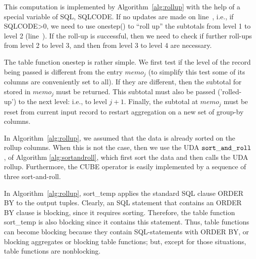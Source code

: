 {This computation is implemented by Algorithm~\ref{alg:rollup} with the
help of a special variable of SQL, {\cw SQLCODE}.  If no updates are made on
line~, i.e., if {\cw SQLCODE>0}, we need to use {\bw
  onestep()} to ``roll up'' the subtotals from level 1 to level 2
(line~). If the roll-up is successful, then we need
to check if further roll-ups from level 2 to level 3, and then from
level 3 to level 4 are necessary.


The table function {\bw onestep} is rather simple. We first test if
the level of the record being passed is different from the entry
$memo_j$ (to simplify this test some of its columns are conveniently
set to {\bw all}).  If they are different, then the subtotal for
stored in $memo_j$ must be returned.  This subtotal must also be
passed ('rolled-up') to the next level: i.e., to level $j+1$.
Finally, the subtotal at $memo_j$ must be reset from current input
record to restart aggregation on a new set of group-by columns.


In Algorithm~\ref{alg:rollup}, we assumed that the data is already
sorted on the rollup columns. When this is not the case, then
we use the  UDA $\small \tt sort\_and\_roll$, of Algorithm \ref{alg:sortandroll},
which first sort the data and then calls the UDA  {\cdf rollup}.
Furthermore, the {\cw CUBE} operator is
easily implemented  by a sequence of three sort-and-roll.

In Algorithm~\ref{alg:rollup},  {\cdf sort\_temp}
applies the standard SQL clause {\cw ORDER BY} to the output
tuples. Clearly, an SQL statement that contains an
 {\cw ORDER BY} clause is blocking, since it requires sorting.
Therefore, the table function {\bw sort\_temp} is also blocking since it
contains this statement. Thus, table functions can become blocking
because they contain SQL-statements with {\cw ORDER BY}, or
blocking aggregates or blocking table functions; but, except for those
situations, table functions are nonblocking.

}
